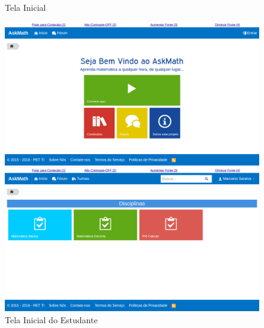 \begin{figure}[h!]
  \centering
  \begin{minipage}[b]{0.49\textwidth}
	\caption{Tela Inicial}
    \includegraphics[width=\textwidth]{figuras/askmath/1}
  \end{minipage}
  \hfill
  \begin{minipage}[b]{0.49\textwidth}
	\caption{Tela Inicial do Estudante}
    \includegraphics[width=\textwidth]{figuras/askmath/2}
  \end{minipage}
 

\end{figure}
